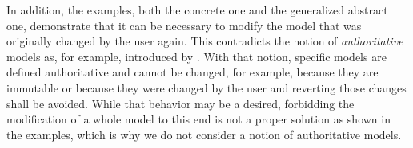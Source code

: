 In addition, the examples, both the concrete one and the generalized abstract one, demonstrate that it can be necessary to modify the model that was originally changed by the user again.
This contradicts the notion of \emph{authoritative} models as, for example, introduced by \textcite{stevens2020BidirectionalTransformationLarge-SoSym}.
With that notion, specific models are defined authoritative and cannot be changed, for example, because they are immutable or because they were changed by the user and reverting those changes shall be avoided.
While that behavior may be a desired, forbidding the modification of a whole model to this end is not a proper solution as shown in the examples, which is why we do not consider a notion of authoritative models.







